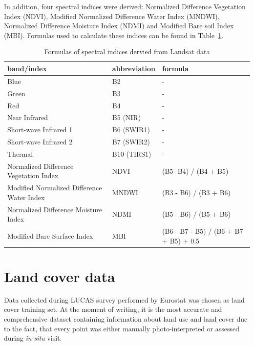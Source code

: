 \documentclass{amuthesis}
\begin{document}
In addition, four spectral indices were derived: Normalized Difference
Vegetation Index (NDVI), Modified Normalized Difference Water Index
(MNDWI), Normalized Difference Moisture Index (NDMI) and Modified Bare
soil Index (MBI). Formulas used to calculate these indices can be found
in Table~\ref{tbl-tabela1}.

\hypertarget{tbl-tabela1}{}
\begin{table}
\caption{\label{tbl-tabela1}Formulas of spectral indices dervied from Landsat data }\tabularnewline

\centering
\begin{tabular}{|>{\raggedright\arraybackslash}p{4cm}|>{}l|>{}l|}
\toprule
\textbf{band/index} & \textbf{abbreviation} & \textbf{formula}\\
\midrule
Blue & B2 & -\\
\hline
Green & B3 & -\\
\hline
Red & B4 & -\\
\hline
Near Infrared & B5 (NIR) & -\\
\hline
Short-wave Infrared 1 & B6 (SWIR1) & -\\
\hline
Short-wave Infrared 2 & B7 (SWIR2) & -\\
\hline
Thermal & B10 (TIRS1) & -\\
\hline
Normalized Difference Vegetation Index & NDVI & (B5 -B4) / (B4 + B5)\\
\hline
Modified Normalized Difference Water Index & MNDWI & (B3 - B6) / (B3 + B6)\\
\hline
Normalized Difference Moisture Index & NDMI & (B5 - B6) / (B5 + B6)\\
\hline
Modified Bare Surface Index & MBI & (B6 - B7 - B5) / (B6 + B7 + B5) + 0.5\\
\bottomrule
\end{tabular}
\end{table}

\hypertarget{sec-landcover}{%
\section{Land cover data}\label{sec-landcover}}

Data collected during LUCAS survey performed by Eurostat was chosen as
land cover training set. At the moment of writing, it is the most
accurate and comprehensive dataset containing information about land use
and land cover \autocite{pflugmacher_mapping_2019} due to the fact, that
every point was either manually photo-interpreted or assessed during
\emph{in-situ} visit.
\end{document}
